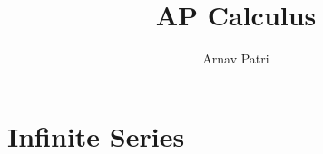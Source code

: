 \documentclass[12pt, A4]{report}
\author{Arnav Patri}
\title{AP Calculus}
\begin{document}
	\maketitle
		\tableofcontents
			\setcounter{part}{9}
			\part{Infinite Series}
				
\end{document}
